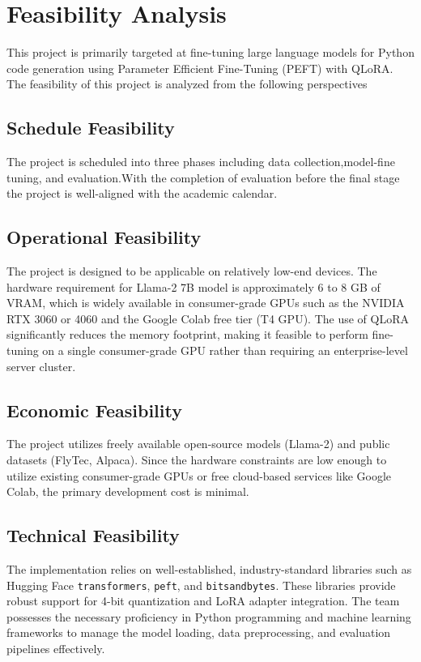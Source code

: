 \section{Feasibility Analysis}
This project is primarily targeted at fine-tuning large language models for Python code generation using Parameter Efficient Fine-Tuning (PEFT) with QLoRA. The feasibility of this project is analyzed from the following perspectives

\subsection{Schedule Feasibility}
The project is scheduled into three phases including data collection,model-fine tuning, and evaluation.With the completion of evaluation before the final stage the project is well-aligned with the academic calendar.

\subsection{Operational Feasibility}
The project is designed to be applicable on relatively low-end devices. The hardware requirement for Llama-2 7B model is approximately 6 to 8 GB of VRAM, which is widely available in consumer-grade GPUs such as the NVIDIA RTX 3060 or 4060 and the Google Colab free tier (T4 GPU). 
The use of QLoRA significantly reduces the memory footprint, making it feasible to perform fine-tuning on a single consumer-grade GPU rather than requiring an enterprise-level server cluster.

\subsection{Economic Feasibility}
The project utilizes freely available open-source models (Llama-2) and public datasets (FlyTec, Alpaca). Since the hardware constraints are low enough to utilize existing consumer-grade GPUs or free cloud-based services like Google Colab, the primary development cost is minimal. 

\subsection{Technical Feasibility}
The implementation relies on well-established, industry-standard libraries such as Hugging Face \texttt{transformers}, \texttt{peft}, and \texttt{bitsandbytes}. These libraries provide robust support for 4-bit quantization and LoRA adapter integration. The team possesses the necessary proficiency in Python programming and machine learning frameworks to manage the model loading, data preprocessing, and evaluation pipelines effectively.

